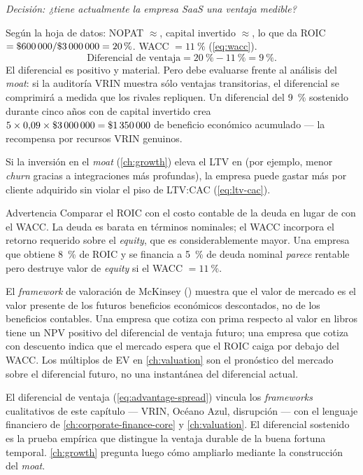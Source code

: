 \begin{example}
\emph{Decisión: ¿tiene actualmente la empresa SaaS una ventaja medible?}

Según la hoja de datos: NOPAT $\approx$, capital invertido $\approx$,
lo que da ROIC $= \$\num{600000}/\$\num{3000000} = \qty{20}{\percent}$. WACC $= \qty{11}{\percent}$
(\cref{eq:wacc}).
\[
  \text{Diferencial de ventaja} = \qty{20}{\percent} - \qty{11}{\percent} = \qty{9}{\percent}.
\]
El diferencial es positivo y material. Pero debe evaluarse frente al análisis del \emph{moat}:
si la auditoría VRIN muestra sólo ventajas transitorias, el diferencial se comprimirá a medida
que los rivales repliquen. Un diferencial del \qty{9}{\percent} sostenido durante cinco años
con  de capital invertido crea $5 \times 0{,}09 \times \$\num{3000000} = \$\num{1350000}$
de beneficio económico acumulado --- la recompensa por recursos VRIN genuinos.

Si la inversión en el \emph{moat} (\cref{ch:growth}) eleva el LTV en  (por ejemplo,
menor \emph{churn} gracias a integraciones más profundas), la empresa puede gastar 
más por cliente adquirido sin violar el piso de LTV:CAC (\cref{eq:ltv-cac}).
\end{example}

\begin{admonition}{Advertencia}
Comparar el ROIC con el costo contable de la deuda en lugar de con el WACC. La deuda es barata
en términos nominales; el WACC incorpora el retorno requerido sobre el \emph{equity}, que es
considerablemente mayor. Una empresa que obtiene \qty{8}{\percent} de ROIC y se financia a
\qty{5}{\percent} de deuda nominal \emph{parece} rentable pero destruye valor de \emph{equity}
si el WACC $=\qty{11}{\percent}$.
\end{admonition}

El \emph{framework} de valoración de McKinsey (\parencite{dranove7theconomics}) muestra que el
valor de mercado es el valor presente de los futuros beneficios económicos descontados, no de
los beneficios contables. Una empresa que cotiza con prima respecto al valor en libros tiene
un NPV positivo del diferencial de ventaja futuro; una empresa que cotiza con descuento indica
que el mercado espera que el ROIC caiga por debajo del WACC. Los múltiplos de EV en
\cref{ch:valuation} son el pronóstico del mercado sobre el diferencial futuro, no una
instantánea del diferencial actual.

El diferencial de ventaja (\cref{eq:advantage-spread}) vincula los \emph{frameworks} cualitativos
de este capítulo --- VRIN, Océano Azul, disrupción --- con el lenguaje financiero de
\cref{ch:corporate-finance-core} y \cref{ch:valuation}. El diferencial sostenido es la prueba
empírica que distingue la ventaja durable de la buena fortuna temporal. \cref{ch:growth}
pregunta luego cómo ampliarlo mediante la construcción del \emph{moat}.
